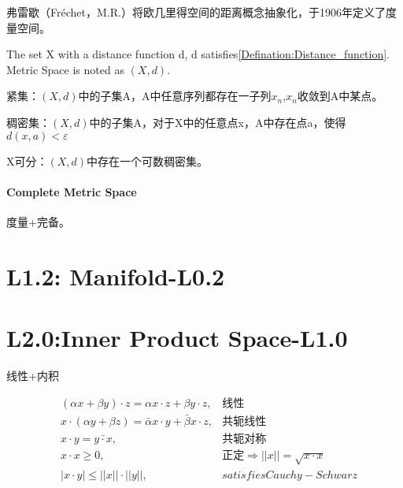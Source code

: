 \documentclass[UTF8]{../../09-Mathematics}
\begin{document}
弗雷歇（Fréchet，M.R.）将欧几里得空间的距离概念抽象化，于1906年定义了度量空间。

\begin{definition}
    The set X with a distance function d, d satisfies\ref{Defination:Distance_function}. Metric Space is noted as $(X,d)$.
\end{definition}

\begin{definition}
    紧集：$(X,d)$中的子集A，A中任意序列都存在一子列$x_n$,$x_n$收敛到A中某点。
\end{definition}

\begin{definition}
    稠密集：$(X,d)$中的子集A，对于X中的任意点x，A中存在点a，使得$d(x,a)< \varepsilon $
\end{definition}

\begin{definition}
    X可分：$(X,d)$中存在一个可数稠密集。
\end{definition}


\subsubsection{Complete Metric Space}

度量+完备。




\chapter{L1.2: Manifold-L0.2}




\chapter{L2.0:Inner Product Space-L1.0}

线性+内积

\begin{equation}%
\begin{aligned}
  &(\alpha x + \beta y ) \cdot z = \alpha x \cdot z + \beta y \cdot z, &   \mbox{线性}\\
  &x \cdot (\alpha y + \beta z) = \bar{ \alpha}    x \cdot y + \bar{ \beta}    x \cdot z,&   \mbox{共轭线性}\\
  &x \cdot y = \bar{ y \cdot x}, &   \mbox{共轭对称}\\
  &x \cdot x \geqslant 0 , &\mbox{正定} \Rightarrow || x || = \sqrt{x \cdot x} \\
  &|x \cdot y| \leqslant || x || \cdot || y ||, &satisfies  Cauchy-Schwarz \\
\end{aligned}
\end{equation}
 
\end{document}
